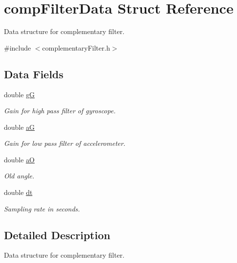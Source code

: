 \hypertarget{structcomp_filter_data}{\section{comp\-Filter\-Data \-Struct \-Reference}
\label{structcomp_filter_data}
}


\-Data structure for complementary filter.  




{\ttfamily \#include $<$complementary\-Filter.\-h$>$}

\subsection*{\-Data \-Fields}
\begin{DoxyCompactItemize}
\item 
double \hyperlink{structcomp_filter_data_a15c4d386f5a6e782dccc9b419633bc82}{g\-G}
\begin{DoxyCompactList}\small\item\em \-Gain for high pass filter of gyroscope. \end{DoxyCompactList}\item 
double \hyperlink{structcomp_filter_data_afa9cf053cc3f14e6f45db1326dd4faa1}{a\-G}
\begin{DoxyCompactList}\small\item\em \-Gain for low pass filter of accelerometer. \end{DoxyCompactList}\item 
\hypertarget{structcomp_filter_data_aa32bf336800522599921b322a5d32562}{double \hyperlink{structcomp_filter_data_aa32bf336800522599921b322a5d32562}{a\-O}}\label{structcomp_filter_data_aa32bf336800522599921b322a5d32562}

\begin{DoxyCompactList}\small\item\em \-Old angle. \end{DoxyCompactList}\item 
double \hyperlink{structcomp_filter_data_a770f288d3048ff6cbee9faa0969fd6b0}{dt}
\begin{DoxyCompactList}\small\item\em \-Sampling rate in seconds. \end{DoxyCompactList}\end{DoxyCompactItemize}


\subsection{\-Detailed \-Description}
\-Data structure for complementary filter. 

